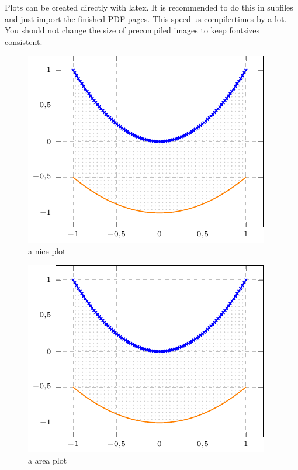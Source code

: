 \documentclass[	%
		fontsize=11pt,  %
		a4paper,	    %
		twoside,		%
		english,		%
		sans,			%
		f1,				%
	]{HsH-report}		%
\begin{document}
		Plots can be created directly with latex. It is recommended to do this in subfiles and just import the finished PDF pages. This speed us
		compilertimes by a lot. You should not change the size of precompiled images to keep fontsizes consistent.
		\begin{figure}
			\includegraphics[page=2]{plt/examplePlot.pdf}
			\caption[centering]{a nice plot}
			\label{fig: plot1}
		\end{figure}
		\begin{figure}
			\includegraphics[page=1]{plt/examplePlot.pdf}
			\caption{a area plot}
			\label{fig: area}
		\end{figure}
\end{document}

